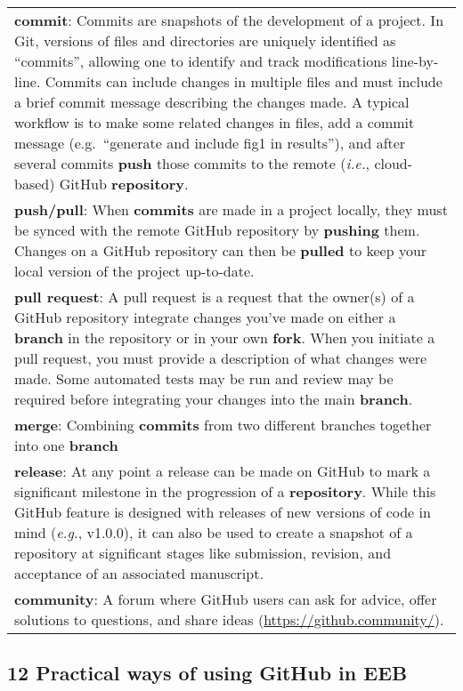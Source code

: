 \begin{tablenos:no-prefix-table-caption}
\begin{longtable}[]{@{}
  >{\raggedright\arraybackslash}p{}@{}}
\textbf{commit}: Commits are snapshots of the development of a project. In Git, versions of files and directories are uniquely identified as ``commits'', allowing one to identify and track modifications line-by-line. Commits can include changes in multiple files and must include a brief commit message describing the changes made. A typical workflow is to make some related changes in files, add a commit message (e.g.~``generate and include fig1 in results''), and after several commits \textbf{push} those commits to the remote (\emph{i.e.}, cloud-based) GitHub \textbf{repository}. \\
\textbf{push/pull}: When \textbf{commits} are made in a project locally, they must be synced with the remote GitHub repository by \textbf{pushing} them. Changes on a GitHub repository can then be \textbf{pulled} to keep your local version of the project up-to-date. \\
\textbf{pull request}: A pull request is a request that the owner(s) of a GitHub repository integrate changes you've made on either a \textbf{branch} in the repository or in your own \textbf{fork}. When you initiate a pull request, you must provide a description of what changes were made. Some automated tests may be run and review may be required before integrating your changes into the main \textbf{branch}. \\
\textbf{merge}: Combining \textbf{commits} from two different branches together into one \textbf{branch} \\
\textbf{release}: At any point a release can be made on GitHub to mark a significant milestone in the progression of a \textbf{repository}. While this GitHub feature is designed with releases of new versions of code in mind (\emph{e.g.}, v1.0.0), it can also be used to create a snapshot of a repository at significant stages like submission, revision, and acceptance of an associated manuscript. \\
\textbf{community}: A forum where GitHub users can ask for advice, offer solutions to questions, and share ideas (\url{https://github.community/}). \\
\bottomrule
\end{longtable}

\end{tablenos:no-prefix-table-caption}

\hypertarget{practical-ways-of-using-github-in-eeb}{%
\subsection{12 Practical ways of using GitHub in EEB}\label{practical-ways-of-using-github-in-eeb}}


